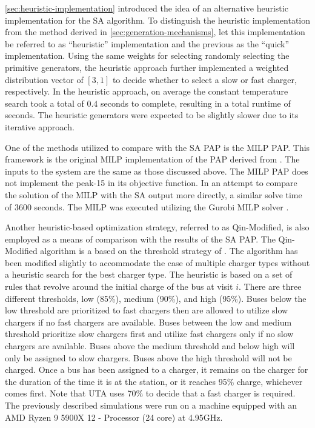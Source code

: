 \documentclass[energies,article,submit,moreauthors]{Definitions/mdpi}
\newcommand{\tempcnt}{9101 }                                                    %
\newcommand{\heuristiclocal}{0.4 }                                             %
\begin{document}
\ref{sec:heuristic-implementation} introduced the idea of an alternative heuristic implementation for the SA algorithm. To
distinguish the heuristic implementation from the method derived in \ref{sec:generation-mechanisms}, let this implementation
be referred to as ``heuristic'' implementation and the previous as the ``quick'' implementation. Using the same weights for
selecting randomly selecting the primitive generators, the heuristic approach further implemented a weighted
distribution vector of \([3, 1]\) to decide whether to select a slow or fast charger, respectively. In the heuristic
approach, on average the constant temperature search took a total of \(\heuristiclocal\) seconds to complete, resulting in
a total runtime of \fpeval{\heuristiclocal * \tempcnt} seconds. The heuristic generators were expected to be
slightly slower due to its iterative approach.

One of the methods utilized to compare with the SA PAP is the MILP PAP. This framework is the original MILP
implementation of the PAP derived from \cite{qarebagh-2019-optim-sched}. The inputs to the system are the same as those
discussed above. The MILP PAP does not implement the peak-15 in its objective function. In an attempt to compare the
solution of the MILP with the SA output more directly, a similar solve time of 3600 seconds. The MILP was executed
utilizing the Gurobi MILP solver \cite{gurobi-2021-gurob-optim}.

Another heuristic-based optimization strategy, referred to as Qin-Modified, is also employed as a means of comparison
with the results of the SA PAP. The Qin-Modified algorithm is a based on the threshold strategy of
\cite{qin-2016-numer-analy}. The algorithm has been modified slightly to accommodate the case of multiple charger types
without a heuristic search for the best charger type. The heuristic is based on a set of rules that revolve around the
initial charge of the bus at visit \(i\). There are three different thresholds, low (85\%), medium (90\%), and high (95\%).
Buses below the low threshold are prioritized to fast chargers then are allowed to utilize slow chargers if no fast
chargers are available. Buses between the low and medium threshold prioritize slow chargers first and utilize fast
chargers only if no slow chargers are available. Buses above the medium threshold and below high will only be assigned
to slow chargers. Buses above the high threshold will not be charged. Once a bus has been assigned to a charger, it
remains on the charger for the duration of the time it is at the station, or it reaches 95\% charge, whichever comes
first. Note that UTA uses 70\% to decide that a fast charger is required. The previously described simulations were run
on a machine equipped with an AMD Ryzen 9 5900X 12 - Processor (24 core) at 4.95GHz.
\end{document}
